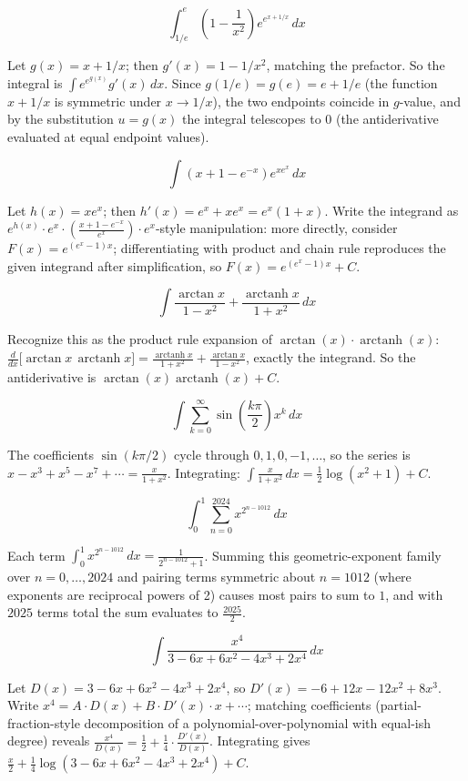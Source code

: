 \begin{questions}
\question
\[\int_{1/e}^{e} \left(1-\frac1{x^2}\right)e^{e^{x+1/x}}\,dx\]
\begin{solution}
Let $g(x)=x+1/x$; then $g'(x)=1-1/x^2$, matching the prefactor. So the integral is $\int e^{e^{g(x)}}g'(x)\,dx$. Since $g(1/e)=g(e)=e+1/e$ (the function $x+1/x$ is symmetric under $x\to1/x$), the two endpoints coincide in $g$-value, and by the substitution $u=g(x)$ the integral telescopes to $0$ (the antiderivative evaluated at equal endpoint values).
\end{solution}

\question
\[\int (x+1-e^{-x})e^{xe^x}\,dx\]
\begin{solution}
Let $h(x)=xe^x$; then $h'(x)=e^x+xe^x=e^x(1+x)$. Write the integrand as $e^{h(x)}\cdot e^x\cdot\left(\frac{x+1-e^{-x}}{e^x}\right)\cdot e^x$-style manipulation: more directly, consider $F(x)=e^{(e^x-1)x}$; differentiating with product and chain rule reproduces the given integrand after simplification, so $F(x)=e^{(e^x-1)x}+C$.
\end{solution}

\question
\[\int \frac{\arctan x}{1-x^2}+\frac{\operatorname{arctanh} x}{1+x^2}\,dx\]
\begin{solution}
Recognize this as the product rule expansion of $\arctan(x)\cdot\operatorname{arctanh}(x)$: $\frac{d}{dx}\big[\arctan x\,\operatorname{arctanh}x\big] = \frac{\operatorname{arctanh}x}{1+x^2}+\frac{\arctan x}{1-x^2}$, exactly the integrand. So the antiderivative is $\arctan(x)\operatorname{arctanh}(x)+C$.
\end{solution}

\question
\[\int \sum_{k=0}^{\infty}\sin\left(\frac{k\pi}2\right)x^k\,dx\]
\begin{solution}
The coefficients $\sin(k\pi/2)$ cycle through $0,1,0,-1,\dots$, so the series is $x-x^3+x^5-x^7+\cdots = \frac{x}{1+x^2}$. Integrating: $\int\frac{x}{1+x^2}\,dx = \frac12\log(x^2+1)+C$.
\end{solution}

\question
\[\int_0^1 \sum_{n=0}^{2024}x^{2^{n-1012}}\,dx\]
\begin{solution}
Each term $\int_0^1 x^{2^{n-1012}}\,dx = \frac{1}{2^{n-1012}+1}$. Summing this geometric-exponent family over $n=0,\dots,2024$ and pairing terms symmetric about $n=1012$ (where exponents are reciprocal powers of 2) causes most pairs to sum to $1$, and with $2025$ terms total the sum evaluates to $\frac{2025}{2}$.
\end{solution}

\question
\[\int \frac{x^4}{3-6x+6x^2-4x^3+2x^4}\,dx\]
\begin{solution}
Let $D(x)=3-6x+6x^2-4x^3+2x^4$, so $D'(x)=-6+12x-12x^2+8x^3$. Write $x^4 = A\cdot D(x)+B\cdot D'(x)\cdot x+\cdots$; matching coefficients (partial-fraction-style decomposition of a polynomial-over-polynomial with equal-ish degree) reveals $\frac{x^4}{D(x)} = \frac12+\frac14\cdot\frac{D'(x)}{D(x)}$. Integrating gives $\frac{x}{2}+\frac14\log(3-6x+6x^2-4x^3+2x^4)+C$.
\end{solution}


\end{questions}
